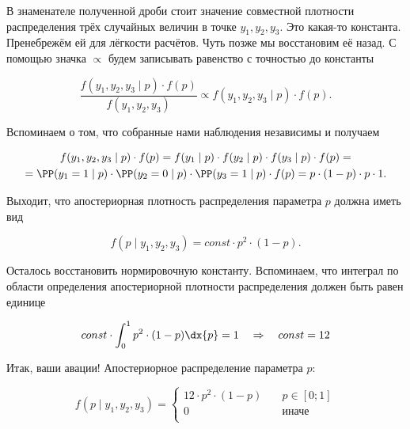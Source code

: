 \documentclass[12pt, a4paper, oneside]{article}
\begin{document}
В знаменателе полученной дроби стоит значение совместной плотности распределения трёх случайных величин в точке $y_1, y_2, y_3$. Это какая-то константа. Пренебрежём ей для лёгкости расчётов. Чуть позже мы восстановим её назад. С помощью значка $\propto$ будем записывать равенство с точностью до константы

\[  \frac{f(y_1,y_2,y_3 \mid p) \cdot f(p)}{f(y_1,y_2,y_3)} \propto f(y_1,y_2,y_3 \mid p) \cdot f(p).\]

Вспоминаем о том, что собранные нами наблюдения независимы и получаем

\begin{multline*}
f(y_1,y_2,y_3 \mid p) \cdot f(p) =  f(y_1 \mid p) \cdot f(y_2 \mid p) \cdot f(y_3 \mid p) \cdot f(p) = \\ = \PP(y_1 = 1 \mid p) \cdot \PP(y_2 = 0 \mid p) \cdot \PP(y_3 = 1 \mid p) \cdot f(p) = p \cdot (1 - p) \cdot p \cdot 1.
\end{multline*}

Выходит, что апостериорная плотность распределения параметра $p$ должна иметь вид

\[ f(p \mid y_1, y_2, y_3) = const \cdot p^2 \cdot (1-p).\]

Осталось восстановить нормировочную константу. Вспоминаем, что интеграл по области определения апостериорной плотности распределения должен быть равен единице


\[ const \cdot \int_0^1 p^2 \cdot (1-p) \dx{p}  = 1 \quad \Rightarrow \quad const = 12 \]

Итак, ваши авации! Апостериорное распределение параметра $p$:

\[ f(p \mid y_1, y_2, y_3) =
\begin{cases}
12 \cdot p^2 \cdot (1-p)   & \quad p \in [0;1] \\
0      & \quad \text{иначе}\\
\end{cases}
\]
\end{document}
